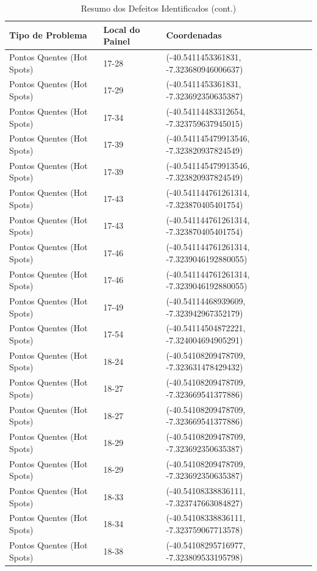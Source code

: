 \documentclass[dvipsnames]{article}%
\begin{document}
\begin{table}[h!]%
\caption{Resumo dos Defeitos Identificados (cont.)}%
\begin{tabular}{lll}%
\toprule%
Tipo de Problema&Local do Painel&Coordenadas\\%
\midrule%
Pontos Quentes (Hot Spots)&17{-}28&({-}40.5411453361831, {-}7.323680946006637)\\%
Pontos Quentes (Hot Spots)&17{-}29&({-}40.5411453361831, {-}7.323692350635387)\\%
Pontos Quentes (Hot Spots)&17{-}34&({-}40.54114483312654, {-}7.323759637945015)\\%
Pontos Quentes (Hot Spots)&17{-}39&({-}40.541145479913546, {-}7.323820937824549)\\%
Pontos Quentes (Hot Spots)&17{-}39&({-}40.541145479913546, {-}7.323820937824549)\\%
Pontos Quentes (Hot Spots)&17{-}43&({-}40.541144761261314, {-}7.323870405401754)\\%
Pontos Quentes (Hot Spots)&17{-}43&({-}40.541144761261314, {-}7.323870405401754)\\%
Pontos Quentes (Hot Spots)&17{-}46&({-}40.541144761261314, {-}7.3239046192880055)\\%
Pontos Quentes (Hot Spots)&17{-}46&({-}40.541144761261314, {-}7.3239046192880055)\\%
Pontos Quentes (Hot Spots)&17{-}49&({-}40.54114468939609, {-}7.323942967352179)\\%
Pontos Quentes (Hot Spots)&17{-}54&({-}40.54114504872221, {-}7.324004694905291)\\%
Pontos Quentes (Hot Spots)&18{-}24&({-}40.54108209478709, {-}7.323631478429432)\\%
Pontos Quentes (Hot Spots)&18{-}27&({-}40.54108209478709, {-}7.323669541377886)\\%
Pontos Quentes (Hot Spots)&18{-}27&({-}40.54108209478709, {-}7.323669541377886)\\%
Pontos Quentes (Hot Spots)&18{-}29&({-}40.54108209478709, {-}7.323692350635387)\\%
Pontos Quentes (Hot Spots)&18{-}29&({-}40.54108209478709, {-}7.323692350635387)\\%
Pontos Quentes (Hot Spots)&18{-}33&({-}40.54108338836111, {-}7.323747663084827)\\%
Pontos Quentes (Hot Spots)&18{-}34&({-}40.54108338836111, {-}7.323759067713578)\\%
Pontos Quentes (Hot Spots)&18{-}38&({-}40.54108295716977, {-}7.323809533195798)\\%

\end{tabular}
\end{table}
\end{document}
